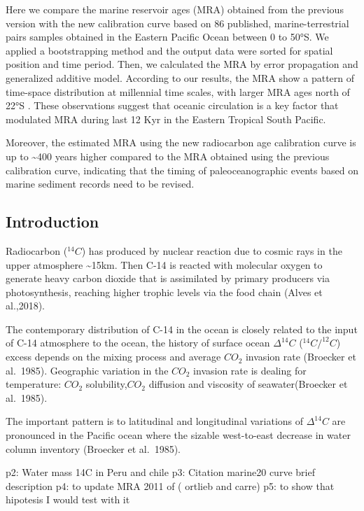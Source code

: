 \documentclass[
]{article}
\begin{document}
Here we compare the marine reservoir ages (MRA) obtained from the
previous version with the new calibration curve based on 86 published,
marine-terrestrial pairs samples obtained in the Eastern Pacific Ocean
between 0 to 50°S. We applied a bootstrapping method and the output data
were sorted for spatial position and time period. Then, we calculated
the MRA by error propagation and generalized additive model. According
to our results, the MRA show a pattern of time-space distribution at
millennial time scales, with larger MRA ages north of 22°S . These
observations suggest that oceanic circulation is a key factor that
modulated MRA during last 12 Kyr in the Eastern Tropical South Pacific.

Moreover, the estimated MRA using the new radiocarbon age calibration
curve is up to \textasciitilde400 years higher compared to the MRA
obtained using the previous calibration curve, indicating that the
timing of paleoceanographic events based on marine sediment records need
to be revised.

\hypertarget{introduction}{%
\subsection{Introduction}\label{introduction}}

Radiocarbon (\(^{14}C\)) has produced by nuclear reaction due to cosmic
rays in the upper atmosphere \textasciitilde15km. Then C-14 is reacted
with molecular oxygen to generate heavy carbon dioxide that is
assimilated by primary producers via photosynthesis, reaching higher
trophic levels via the food chain (Alves et al.,2018).

The contemporary distribution of C-14 in the ocean is closely related to
the input of C-14 atmosphere to the ocean, the history of surface ocean
\(\Delta^{14}C\) (\(^{14}C/^{12}C\)) excess depends on the mixing
process and average \(CO_2\) invasion rate (Broecker et al.~1985).
Geographic variation in the \(CO_2\) invasion rate is dealing for
temperature: \(CO_2\) solubility,\(CO_2\) diffusion and viscosity of
seawater(Broecker et al.~1985).

The important pattern is to latitudinal and longitudinal variations of
\(\Delta^{14}C\) are pronounced in the Pacific ocean where the sizable
west-to-east decrease in water column inventory (Broecker et al.~1985).

p2: Water mass 14C in Peru and chile p3: Citation marine20 curve brief
description p4: to update MRA 2011 of ( ortlieb and carre) p5: to show
that hipotesis I would test with it
\end{document}
